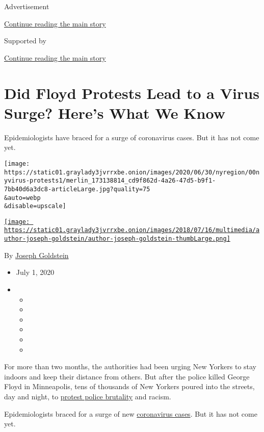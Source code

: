 Advertisement

\protect\hyperlink{after-top}{Continue reading the main story}

Supported by

\protect\hyperlink{after-sponsor}{Continue reading the main story}

\hypertarget{did-floyd-protests-lead-to-a-virus-surge-heres-what-we-know}{%
\section{Did Floyd Protests Lead to a Virus Surge? Here's What We
Know}\label{did-floyd-protests-lead-to-a-virus-surge-heres-what-we-know}}

Epidemiologists have braced for a surge of coronavirus cases. But it has
not come yet.

\texttt{[image: https://static01.graylady3jvrrxbe.onion/images/2020/06/30/nyregion/00nyvirus-protests1/merlin\_173138814\_cd9f862d-4a26-47d5-b9f1-7bb40d6a3dc8-articleLarge.jpg?quality=75\\\&auto=webp\\\&disable=upscale]}

\href{https://www.nytimes3xbfgragh.onion/by/joseph-goldstein}{\texttt{[image: https://static01.graylady3jvrrxbe.onion/images/2018/07/16/multimedia/author-joseph-goldstein/author-joseph-goldstein-thumbLarge.png]}}

By \href{https://www.nytimes3xbfgragh.onion/by/joseph-goldstein}{Joseph
Goldstein}

\begin{itemize}
\item
  July 1, 2020
\item
  \begin{itemize}
  \item
  \item
  \item
  \item
  \item
  \item
  \end{itemize}
\end{itemize}

For more than two months, the authorities had been urging New Yorkers to
stay indoors and keep their distance from others. But after the police
killed George Floyd in Minneapolis, tens of thousands of New Yorkers
poured into the streets, day and night, to
\href{https://www.nytimes3xbfgragh.onion/2020/07/20/us/politics/portland-federal-agents-trump.html}{protest
police brutality} and racism.

Epidemiologists braced for a surge of new
\href{https://www.nytimes3xbfgragh.onion/2020/07/21/health/coronavirus-infections-us.html}{coronavirus
cases}. But it has not come yet.

